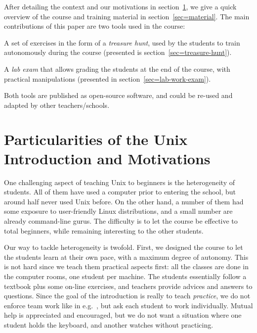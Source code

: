 \documentclass{sig-alternate}
\begin{document}
After detailing the context and our motivations in
section~\ref{sec=motivations}, we give a quick overview of the course
and training material in section~\ref{sec=material}. The main
contributions of this paper are two tools used in the course:

\begin{compactitem}
\item A set of exercises in the form of a \emph{treasure hunt}, used
  by the students to train autonomously during the course (presented
  is section~\ref{sec=treasure-hunt}).
\item A \emph{lab exam} that allows grading the students at the
  end of the course, with practical manipulations (presented in
  section~\ref{sec=lab-work-exam}).
\end{compactitem}

Both tools are published as open-source software, and could be re-used
and adapted by other teachers/schools.

\section{Particularities of the Unix Introduction and Motivations}
\label{sec=motivations}

One challenging aspect of teaching Unix to beginners is the
heterogeneity of students. All of them have used a computer prior to
entering the school,
but around half never used Unix before. On the other hand, a number of
them had some exposure to user-friendly Linux distributions, and a
small number are already command-line gurus. The difficulty is to let
the course be effective to total beginners, while remaining interesting
to the other students.

Our way to tackle heterogeneity is twofold. First, we designed the
course to let the students learn at their own pace, with a maximum
degree of autonomy. This is not hard since we teach them practical
aspects first: all the classes are done in the computer rooms, one
student per machine. The students essentially follow a textbook plus
some on-line exercises, and teachers provide advices and answers to
questions.
Since the goal of the introduction is really to teach \emph{practice},
we do not enforce team work like in
e.g.~\cite{DBLP:conf/iticse/HurtadoV05}, but ask each student to work
individually. Mutual help is appreciated and encouraged, but we do not
want a situation where one student holds the keyboard, and another
watches without practicing.
\end{document}
